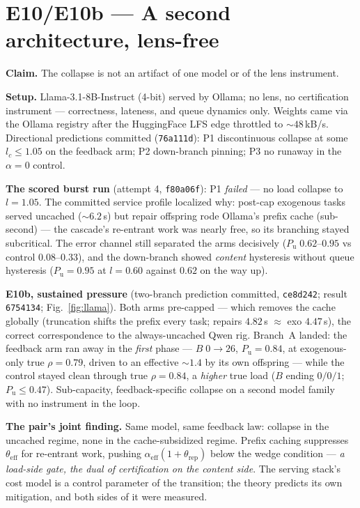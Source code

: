 \documentclass[11pt]{article}
\newcommand{\commit}[1]{\texttt{\small #1}}
\newcommand{\Pu}{P_{\mathrm{u}}}
\begin{document}
\section{E10/E10b --- A second architecture, lens-free}
\label{sec:e10}
\textbf{Claim.} The collapse is not an artifact of one model or of the
lens instrument.

\textbf{Setup.} Llama-3.1-8B-Instruct (4-bit) served by Ollama; no
lens, no certification instrument --- correctness, lateness, and queue
dynamics only. Weights came via the Ollama registry after the
HuggingFace LFS edge throttled to $\sim\!48$\,kB/s. Directional
predictions committed (\commit{76a111d}): P1 discontinuous collapse at
some $l_c \le 1.05$ on the feedback arm; P2 down-branch pinning; P3 no
runaway in the $\alpha{=}0$ control.

\textbf{The scored burst run} (attempt 4, \commit{f80a06f}): P1
\emph{failed} --- no load collapse to $l = 1.05$. The committed service
profile localized why: post-cap exogenous tasks served uncached
($\sim\!6.2$\,s) but repair offspring rode Ollama's prefix cache
(sub-second) --- the cascade's re-entrant work was nearly free, so its
branching stayed subcritical. The error channel still separated the
arms decisively ($\Pu\;0.62$--$0.95$ vs control $0.08$--$0.33$), and
the down-branch showed \emph{content} hysteresis without queue
hysteresis ($\Pu = 0.95$ at $l=0.60$ against $0.62$ on the way up).

\textbf{E10b, sustained pressure} (two-branch prediction committed,
\commit{ce8d242}; result \commit{6754134}; Fig.~\ref{fig:llama}). Both
arms pre-capped --- which removes the cache globally (truncation shifts
the prefix every task; repairs $4.82$\,s $\approx$ exo $4.47$\,s), the
correct correspondence to the always-uncached Qwen rig. Branch~A
landed: the feedback arm ran away in the \emph{first} phase --- $B\;0
\to 26$, $\Pu = 0.84$, at exogenous-only true $\rho = 0.79$, driven to
an effective $\sim\!1.4$ by its own offspring --- while the control
stayed clean through true $\rho = 0.84$, a \emph{higher} true load
($B$ ending $0/0/1$; $\Pu \le 0.47$). Sub-capacity, feedback-specific
collapse on a second model family with no instrument in the loop.

\textbf{The pair's joint finding.} Same model, same feedback law:
collapse in the uncached regime, none in the cache-subsidized regime.
Prefix caching suppresses $\theta_{\mathrm{eff}}$ for re-entrant work,
pushing $\alpha_{\mathrm{eff}}(1+\theta_{\mathrm{rep}})$ below the
wedge condition --- \emph{a load-side gate, the dual of certification
on the content side}. The serving stack's cost model is a control
parameter of the transition; the theory predicts its own mitigation,
and both sides of it were measured.
\end{document}
